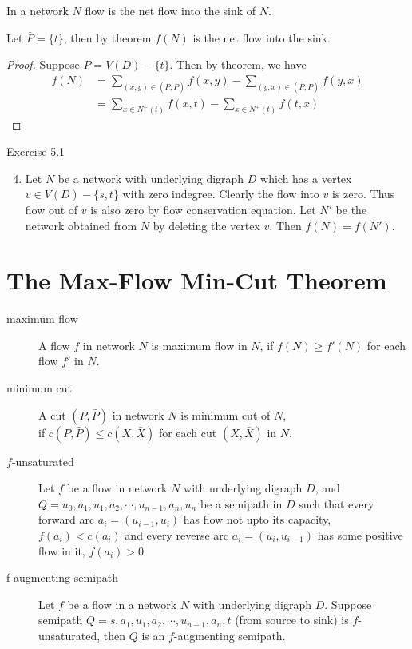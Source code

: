 \begin{corollary}
	In a network $N$ flow is the net flow into the sink of $N$.
\end{corollary}
\begin{synopsis}
	Let $\bar{P} = \{ t \}$, then by theorem $f(N)$ is the net flow into the sink.
\end{synopsis}
\begin{proof}
	Suppose $P = V(D)-\{t\}$. Then by theorem, we have
	\begin{align*}
		f(N) 	& = \sum_{(x,y) \in (P,\bar{P})} f(x,y) - \sum_{(y,x) \in (\bar{P},P)} f(y,x) \\
			& = \sum_{x \in N^-(t)} f(x,t) - \sum_{x \in N^+(t)} f(t,x)
	\end{align*}
\end{proof}

\begin{remark}Exercise 5.1
	\begin{enumerate}
		\setcounter{enumi}{3}
		\item Let $N$ be a network with underlying digraph $D$ which has a vertex $v \in V(D) - \{ s,t \}$ with zero indegree. Clearly the flow into $v$ is zero. Thus flow out of $v$ is also zero by flow conservation equation. Let $N'$ be the network obtained from $N$ by deleting the vertex $v$. Then $f(N) = f(N')$.
	\end{enumerate}
\end{remark}

\section{The Max-Flow Min-Cut Theorem}
\begin{description}
	\item[maximum flow] A flow $f$ in network $N$ is maximum flow in $N$, if $f(N) \ge f'(N)$ for each flow $f'$ in $N$.
	\item[minimum cut] A cut $(P,\bar{P})$ in network $N$ is minimum cut of $N$,\\ if $c(P,\bar{P}) \le c(X,\bar{X})$ for each cut $(X,\bar{X})$ in $N$.
	\item[$f$-unsaturated] Let $f$ be a flow in network $N$ with underlying digraph $D$, and $Q = u_0,a_1,u_1,a_2,\cdots,u_{n-1},a_n,u_n$ be a semipath in $D$ such that every forward arc $a_i = (u_{i-1},u_i)$ has flow not upto its capacity, $f(a_i) < c(a_i)$ and every reverse arc $a_i = (u_i,u_{i-1})$ has some positive flow in it, $f(a_i) > 0$
	\item[f-augmenting semipath] Let $f$ be a flow in a network $N$ with underlying digraph $D$. Suppose semipath $Q = s,a_1,u_1,a_2,\cdots,u_{n-1},a_n,t$ (from source to sink) is $f$-unsaturated, then $Q$ is an $f$-augmenting semipath.
\end{description}

